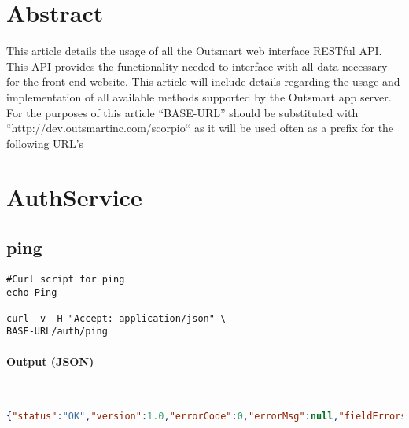 \documentclass[
10pt, %
letterpaper, %
oneside, %
headinclude,footinclude, %
BCOR5mm, %
]{scrartcl}
\title{\normalfont\spacedallcaps{Scorpio REST API}} %
\author{\spacedlowsmallcaps{Michael Meding* , mmeding@outsmartinc.com}} %
\date{} %
\begin{document}
\maketitle %

\setcounter{tocdepth}{2} %

\tableofcontents %

\thispagestyle{empty} %

 
\section*{Abstract}
This article details the usage of all the Outsmart web interface RESTful API. This API provides the functionality needed to interface with all data necessary for the front end website.
 This article will include details regarding the usage and implementation of all available methods supported by the Outsmart app server. For the purposes of this article ``BASE-URL'' should be 
 substituted with ``http://dev.outsmartinc.com/scorpio`` as it will be used often as a prefix for the following URL's
 


\section{AuthService}


\subsection{\textbf{ping}}
\begin{lstlisting}
#Curl script for ping
echo Ping

curl -v -H "Accept: application/json" \
BASE-URL/auth/ping

\end{lstlisting}

\paragraph{Output (JSON)}~
\begin{lstlisting}[language=json]
{"status":"OK","version":1.0,"errorCode":0,"errorMsg":null,"fieldErrors":null,"data":null} 
\end{lstlisting}
\end{document}
